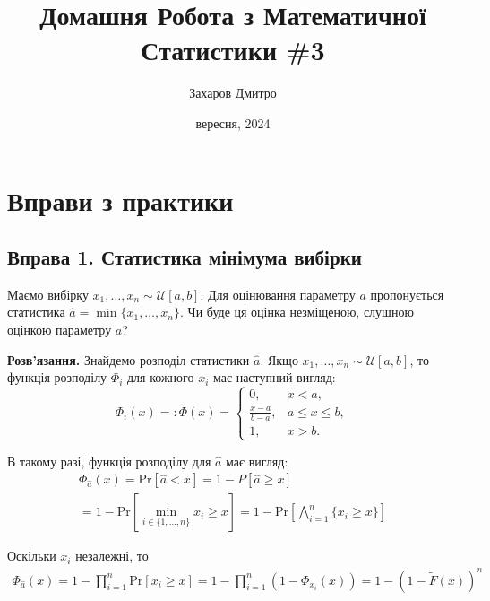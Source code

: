 \documentclass{hw_template}
\title{\huge\sffamily\bfseries Домашня Робота з Математичної Статистики \#3}
\author{\Large\sffamily Захаров Дмитро}
\date{\sffamily 20 вересня, 2024}
\begin{document}
\pagestyle{fancy}

\maketitle

\tableofcontents

\pagebreak

\section{Вправи з практики}

\subsection{Вправа 1. Статистика мінімума вибірки}

\begin{problem}
    Маємо вибірку $x_1,\dots,x_n \sim \mathcal{U}[a,b]$. Для оцінювання параметру $a$ пропонується статистика $\hat{a} = \min \{x_1,\dots,x_n\}$. Чи буде ця оцінка незміщеною, слушною оцінкою параметру $a$?   
\end{problem}

\textbf{Розв'язання.} Знайдемо розподіл статистики $\hat{a}$. Якщо $x_1,\dots,x_n \sim \mathcal{U}[a,b]$, то функція розподілу $\Phi_i$ для кожного $x_i$ має наступний вигляд:
\begin{equation*}
    \Phi_{i}(x) =: \widetilde{\Phi}(x) = 
    \begin{cases}
        0, & x < a, \\
        \frac{x-a}{b-a}, & a \leq x \leq b, \\
        1, & x > b.
    \end{cases}
\end{equation*}

В такому разі, функція розподілу для $\hat{a}$ має вигляд:
\begin{align*}
    \Phi_{\hat{a}}(x) = \text{Pr}[\hat{a} < x] = 1 - P[\hat{a} \geq x] \\ = 1 - \text{Pr}\left[\min_{i \in \{1,\dots, n\}} x_i \geq x\right] = 1 - \text{Pr}\left[\bigwedge_{i=1}^n \{x_i \geq x\}\right]
\end{align*}

Оскільки $x_i$ незалежні, то
\begin{align*}
    \Phi_{\hat{a}}(x) = 1 - \prod_{i=1}^n \text{Pr}[x_i \geq x] = 1 - \prod_{i=1}^n (1 - \Phi_{x_i}(x)) = 1 - (1 - \widetilde{F}(x))^n
\end{align*}
\end{document}
